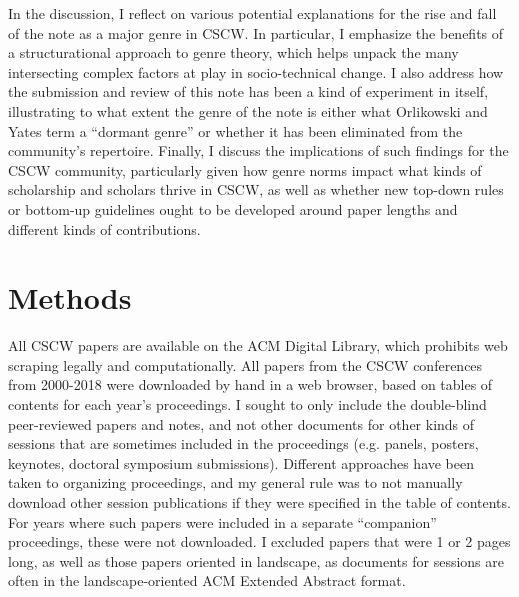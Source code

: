 \documentclass[format=acmsmall, screen=true]{acmart}
\begin{document}
In the discussion, I reflect on various potential explanations for the rise and fall of the note as a major genre in CSCW. In particular, I emphasize the benefits of a structurational approach to genre theory, which helps unpack the many intersecting complex factors at play in socio-technical change. I also address how the submission and review of this note has been a kind of experiment in itself, illustrating to what extent the genre of the note is either what Orlikowski and Yates term a ``dormant genre'' or whether it has been eliminated from the community's repertoire. Finally, I discuss the implications of such findings for the CSCW community, particularly given how genre norms impact what kinds of scholarship and scholars thrive in CSCW, as well as whether new top-down rules or bottom-up guidelines ought to be developed around paper lengths and different kinds of contributions. 

\section{Methods}
\label{methods}
All CSCW papers are available on the ACM Digital Library, which prohibits web scraping legally and computationally. All papers from the CSCW conferences from 2000-2018 were downloaded by hand in a web browser, based on tables of contents for each year's proceedings. I sought to only include the double-blind peer-reviewed papers and notes, and not other documents for other kinds of sessions that are sometimes included in the proceedings (e.g. panels, posters, keynotes, doctoral symposium submissions). Different approaches have been taken to organizing proceedings, and my general rule was to not manually download other session publications if they were specified in the table of contents. For years where such papers were included in a separate ``companion'' proceedings, these were not downloaded. I excluded papers that were 1 or 2 pages long, as well as those papers oriented in landscape, as documents for sessions are often in the landscape-oriented ACM Extended Abstract format.
\end{document}
